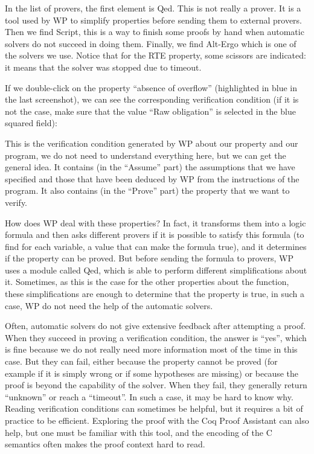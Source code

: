In the list of provers, the first element is Qed. This is not really a prover.
It is a tool used by WP to simplify properties before sending them to external
provers. Then we find Script, this is a way to finish some proofs by hand when
automatic solvers do not succeed in doing them. Finally, we find Alt-Ergo
which is one of the solvers we use. Notice that for the RTE property, some
scissors are indicated: it means that the solver was stopped due to timeout.



If we double-click on the property ``absence of overflow''
(highlighted in blue in the last screenshot), we can see the corresponding
verification condition (if it is not the case, make sure that the value ``Raw
obligation'' is selected in the blue squared field):





This is the verification condition generated by WP about our property and our
program, we do not need to understand everything here, but we can get the
general idea. It contains (in the ``Assume'' part) the assumptions that
we have specified and those that have been deduced by WP from the
instructions of the program. It also contains (in the ``Prove'' part)
the property that we want to verify.



How does WP deal with these properties? In fact, it transforms them
into a logic formula and then asks different provers if it is
possible to satisfy this formula (to find for each variable, a value
that can make the formula true), and it determines if the property can
be proved. But before sending the formula to provers, WP uses a module
called Qed, which is able to perform different simplifications about it.
Sometimes, as this is the case for the other properties about the
 function, these simplifications are enough to determine that
the property is true, in such a case, WP do not need the help of the
automatic solvers.


Often, automatic solvers do not give extensive feedback after attempting a
proof. When they succeed in proving a verification condition, the answer is
``yes'', which is fine because we do not really need more information most of
the time in this case. But they can fail, either because the property cannot be
proved (for example if it is simply wrong or if some hypotheses are missing) or
because the proof is beyond the capability of the solver. When they fail, they
generally return ``unknown'' or reach a ``timeout''. In such a case, it may be
hard to know why. Reading verification conditions can sometimes be helpful, but
it requires a bit of practice to be efficient. Exploring the proof with the
Coq Proof Assistant can also help, but one must be familiar with this tool, and
the encoding of the C semantics often makes the proof context hard to read.

